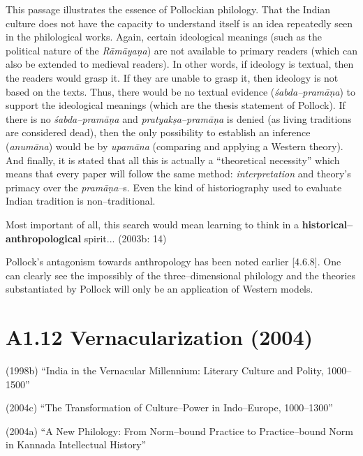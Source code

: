 This passage illustrates the essence of Pollockian philology. That the Indian culture does not have the capacity to understand itself is an idea repeatedly seen in the philological works. Again, certain ideological meanings (such as the political nature of the \textit{Rāmāyaṇa}) are not available to primary readers (which can also be extended to medieval readers). In other words, if ideology is textual, then the readers would grasp it. If they are unable to grasp it, then ideology is not based on the texts. Thus, there would be no textual evidence (\textit{śabda–pramāṇa}) to support the ideological meanings (which are the thesis statement of Pollock). If there is no \textit{śabda–pramāṇa} and \textit{pratyakṣa–pramāṇa }is denied (as living traditions are considered dead), then the only possibility to establish an inference (\textit{anumāna}) would be by \textit{upamāna} (comparing and applying a Western theory). And finally, it is stated that all this is actually a “theoretical necessity” which means that every paper will follow the same method: \textit{interpretation} and theory’s primacy over the \textit{pramāṇa}–s. Even the kind of historiography used to evaluate Indian tradition is non–traditional.

\begin{myquote}
Most important of all, this search would mean learning to think in a \textbf{historical–anthropological} spirit... (2003b: 14)
\end{myquote}

Pollock’s antagonism towards anthropology has been noted earlier [4.6.8]. One can clearly see the impossibly of the three–dimensional philology and the theories substantiated by Pollock will only be an application of Western models.


\section*{A1.12 Vernacularization (2004)}

\item (1998b) “India in the Vernacular Millennium: Literary Culture and Polity, 1000–1500”

 \item (2004c) “The Transformation of Culture–Power in Indo–Europe, 1000–1300”

 \item (2004a) “A New Philology: From Norm–bound Practice to Practice–bound Norm in Kannada Intellectual History”

